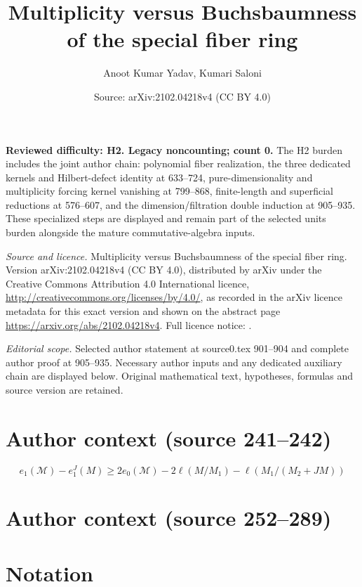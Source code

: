 \documentclass[10pt,a4paper]{amsart}
\title[Author proof 107880]{Multiplicity versus Buchsbaumness of the special fiber ring}
\author{Anoot Kumar Yadav, Kumari Saloni}
\date{Source: arXiv:2102.04218v4 (CC BY 4.0)}
\def\M{{\mathcal M}}
\begin{document}
\maketitle
\noindent\textbf{Reviewed difficulty: H2. Legacy noncounting; count 0.} The H2 burden includes the joint author chain: polynomial fiber realization, the three dedicated kernels and Hilbert-defect identity at 633--724, pure-dimensionality and multiplicity forcing kernel vanishing at 799--868, finite-length and superficial reductions at 576--607, and the dimension/filtration double induction at 905--935. These specialized steps are displayed and remain part of the selected unit\textquotesingle s burden alongside the mature commutative-algebra inputs.\par\medskip

\noindent\emph{Source and licence.} Multiplicity versus Buchsbaumness of the special fiber ring. Version arXiv:2102.04218v4 (CC BY 4.0), distributed by arXiv under the Creative Commons Attribution 4.0 International licence, \url{http://creativecommons.org/licenses/by/4.0/}, as recorded in the arXiv licence metadata for this exact version and shown on the abstract page \url{https://arxiv.org/abs/2102.04218v4}. Full licence notice: .\par\smallskip


\noindent\textit{Editorial scope.} Selected author statement at source0.tex 901--904 and complete author proof at 905--935. Necessary author inputs and any dedicated auxiliary chain are displayed below. Original mathematical text, hypotheses, formulas and source version are retained.\par\smallskip
\section*{Author context (source 241--242)}
	 \begin{equation}\label{very-1st-eqn(a)}
	 	e_1(\M)-e_1^J(M)\geq 2e_0(\M)-2\ell(M/M_1)-\ell(M_1/(M_2+JM)) \end{equation}

\section*{Author context (source 252--289)}
\section{Notation}\label{notation}
\end{document}
